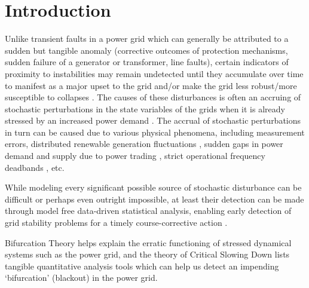 \section[Introduction]{Introduction}
\label{sec:intro}

Unlike transient faults in a power grid which can generally be attributed to a sudden but tangible anomaly (corrective outcomes of protection mechanisms, sudden failure of a generator or transformer, line faults), certain indicators of proximity to instabilities may remain undetected until they accumulate over time to manifest as a major upset to the grid \cite{entsoeReportGridCollapseContinentalEurope2021Jan} and/or make the grid less robust/more susceptible to collapses \cite{schafer01}. The causes of these disturbances is often an accruing of stochastic perturbations in the state variables of the grids when it is already stressed by an increased power demand \cite{rosehartBifurcationAnalysisOfVariousPowerSystemModels}.  The accrual of stochastic perturbations in turn can be caused due to various physical phenomena, including measurement errors, distributed renewable generation fluctuations \cite{adeen01}, sudden gaps in power demand and supply due to power trading \cite{schafer01}, strict operational frequency deadbands \cite{vorobev01, francesca01}, etc.
 
While modeling every significant possible source of stochastic disturbance can be difficult or perhaps even outright impossible, at least their detection can be made through model free data-driven statistical analysis, enabling early detection of grid stability problems for a timely course-corrective action \cite{schafer01, sanchez01, ghanvati01}.

Bifurcation Theory \cite{nathanKutzNotesOnBifurcationTheoryAndNormalForms, rosehartBifurcationAnalysisOfVariousPowerSystemModels, chenBifurcationsAndChaosInEngineering, mohlerDyanmicsAndControlPartOne} helps explain the erratic functioning of stressed dynamical systems such as the power grid, and the theory of Critical Slowing Down \cite{schefferEarlyWarningSignalsForCriticalTransitions} lists tangible quantitative analysis tools which can help us detect an impending `bifurcation' (blackout) in the power grid.

